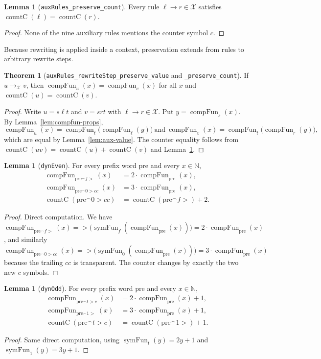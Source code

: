 \documentclass[11pt,a4paper]{article}
\theoremstyle{definition}
\newtheorem{lemma}[definition]{Lemma}
\newtheorem{theorem}[definition]{Theorem}
\newcommand{\gt}{>}
\newcommand{\Nat}{\mathbb{N}}
\newcommand{\conc}{{^\frown}}
\newcommand{\pre}{\text{pre}}
\newcommand{\symfun}{\operatorname{symFun}}
\newcommand{\compFun}{\operatorname{compFun}}
\newcommand{\countC}{\operatorname{countC}}
\newcommand{\auxRules}{\mathcal{X}}
\begin{document}
\begin{lemma}[\texttt{auxRules\_preserve\_count}]
  \label{lem:aux-count}
  Every rule $\ell\to r\in\auxRules$ satisfies $\countC(\ell)=\countC(r)$.
\end{lemma}
\begin{proof}
  None of the nine auxiliary rules mentions the counter symbol $c$.
\end{proof}

Because rewriting is applied inside a context, preservation extends from
rules to arbitrary rewrite steps.

\begin{theorem}[\texttt{auxRules\_rewriteStep\_preserve\_value} and
  \texttt{\_preserve\_count}]
  \label{thm:aux-step}
  If $u\to_{\auxRules}v$, then $\compFun_u(x)=\compFun_v(x)$ for all
  $x$ and $\countC(u)=\countC(v)$.
\end{theorem}
\begin{proof}
  Write $u=s\ell t$ and $v=srt$ with $\ell\to r\in\auxRules$.  Put
  $y=\compFun_s(x)$.  By Lemma~\ref{lem:compfun-props},
  \[
    \compFun_u(x)=\compFun_t\bigl(\compFun_\ell(y)\bigr)
    \:\text{and}\:
    \compFun_v(x)=\compFun_t\bigl(\compFun_r(y)\bigr),
  \]
  which are equal by Lemma~\ref{lem:aux-value}.  The counter equality
  follows from $\countC(uv)=\countC(u)+\countC(v)$ and
  Lemma~\ref{lem:aux-count}.
\end{proof}

\begin{lemma}[\texttt{dynEven}]
  \label{lem:dyn-even}
  For every prefix word $\pre$ and every $x\in\Nat$,
  \begin{align*}
    \compFun_{\pre\conc f\gt}(x)&=2\cdot\compFun_\pre(x),\\
    \compFun_{\pre\conc 0\gt cc}(x)&=3\cdot\compFun_\pre(x),\\
    \countC(\pre\conc 0\gt cc)&=\countC(\pre\conc f\gt)+2.
  \end{align*}
\end{lemma}
\begin{proof}
  Direct computation.  We have
  $\compFun_{\pre\conc f\gt}(x)=\gt\bigl(\symfun_f(\compFun_\pre(x))\bigr)
  =2\cdot\compFun_\pre(x)$, and similarly
  $\compFun_{\pre\conc 0\gt cc}(x)=\gt\bigl(\symfun_0(\compFun_\pre(x))\bigr)
  =3\cdot\compFun_\pre(x)$ because the trailing $cc$ is transparent.
  The counter changes by exactly the two new $c$ symbols.
\end{proof}

\begin{lemma}[\texttt{dynOdd}]
  \label{lem:dyn-odd}
  For every prefix word $\pre$ and every $x\in\Nat$,
  \begin{align*}
    \compFun_{\pre\conc t\gt c}(x)&=2\cdot\compFun_\pre(x)+1,\\
    \compFun_{\pre\conc 1\gt}(x)&=3\cdot\compFun_\pre(x)+1,\\
    \countC(\pre\conc t\gt c)&=\countC(\pre\conc 1\gt)+1.
  \end{align*}
\end{lemma}
\begin{proof}
  Same direct computation, using $\symfun_t(y)=2y+1$ and
  $\symfun_1(y)=3y+1$.
\end{proof}
\end{document}
